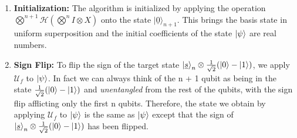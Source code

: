 \documentclass[english]{article}
\begin{document}
				\begin{enumerate}
					\item \textbf{Initialization:}
					The algorithm is initialized by applying the operation $\bigotimes^{n+1}\mathcal{H}(\bigotimes^n I\otimes X)$ onto the state $|\underline{0}\rangle_{n+1}$. This brings the basis state in uniform superposition and the initial coefficients of the state $\left\vert{\psi}\right\rangle$ are real numbers. 
					
					\item \textbf{Sign Flip:}
					To flip the sign of the target state $\left\vert{\underline{s}}\right\rangle_n \otimes \frac{1}{\sqrt{2}}(\left\vert{0}\right\rangle-\left\vert{1}\right\rangle)$, we apply $\mathcal{U}_f$ to $\left\vert{\psi}\right\rangle$. In fact we can always think of the n + 1 qubit as being in the state $\frac{1}{\sqrt{2}}(\left\vert{0}\right\rangle-\left\vert{1}\right\rangle)$ and \emph{unentangled} from the rest of the qubits, with the sign flip afflicting only the first n qubits. Therefore, the state we obtain by applying $\mathcal{U}_f$ to $\left\vert{\psi}\right\rangle$ is the same as $\left\vert{\psi}\right\rangle$ except that the sign of $\left\vert{\underline{s}}\right\rangle_n \otimes \frac{1}{\sqrt{2}}(\left\vert{0}\right\rangle-\left\vert{1}\right\rangle)$ has been flipped.
					

\end{enumerate}
\end{document}
